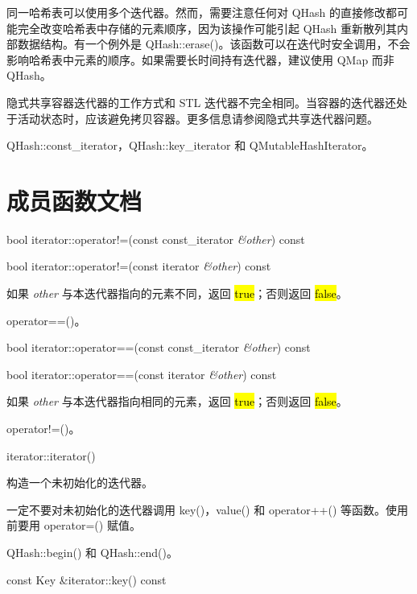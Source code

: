 同一哈希表可以使用多个迭代器。然而，需要注意任何对 QHash 的直接修改都可能完全改变哈希表中存储的元素顺序，因为该操作可能引起 QHash 重新散列其内部数据结构。有一个例外是 QHash::erase()。该函数可以在迭代时安全调用，不会影响哈希表中元素的顺序。如果需要长时间持有迭代器，建议使用 QMap 而非 QHash。

\begin{warning}
隐式共享容器迭代器的工作方式和 STL 迭代器不完全相同。当容器的迭代器还处于活动状态时，应该避免拷贝容器。更多信息请参阅隐式共享迭代器问题。
\end{warning}
 
\begin{seeAlso}
QHash::const\_iterator，QHash::key\_iterator 和
QMutableHashIterator。
\end{seeAlso}

\section{成员函数文档}

bool iterator::operator!=(const const\_iterator \emph{\&other}) const

bool iterator::operator!=(const iterator \emph{\&other}) const

如果 \emph{other} 与本迭代器指向的元素不同，返回 \hl{true}；否则返回 \hl{false}。

\begin{seeAlso}
operator==()。
\end{seeAlso}
 

bool iterator::operator==(const const\_iterator \emph{\&other}) const

bool iterator::operator==(const iterator \emph{\&other}) const

如果 \emph{other} 与本迭代器指向相同的元素，返回 \hl{true}；否则返回 \hl{false}。



\begin{seeAlso}
operator!=()。
\end{seeAlso}

iterator::iterator()

构造一个未初始化的迭代器。

一定不要对未初始化的迭代器调用 key()，value() 和 operator++() 等函数。使用前要用 operator=() 赋值。


\begin{seeAlso}
 QHash::begin() 和 QHash::end()。
\end{seeAlso}

const Key \&iterator::key() const

